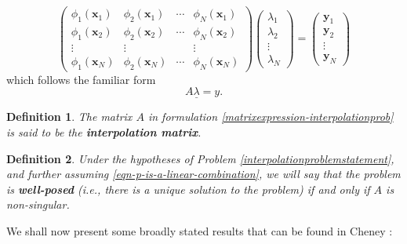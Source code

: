\documentclass[12pt]{report} %
\newtheorem{definition}{Definition}
\newcommand{\tmmathbf}[1]{\ensuremath{\boldsymbol{#1}}}
\newcommand{\tmstrong}[1]{\textbf{#1}}
\begin{document}
\begin{equation}
  \left(\begin{array}{cccc}
      \phi_1 (\tmmathbf{x}_1) & \phi_2 (\tmmathbf{x}_1) & \cdots & \phi_N
      (\tmmathbf{x}_1)                                                    \\
      \phi_1 (\tmmathbf{x}_2) & \phi_2 (\tmmathbf{x}_2) & \cdots & \phi_N
      (\tmmathbf{x}_2)                                                    \\
      \vdots                  & \vdots                  &        & \vdots \\
      \phi_1 (\tmmathbf{x}_N) & \phi_2 (\tmmathbf{x}_N) & \cdots & \phi_N
      (\tmmathbf{x}_N)
    \end{array}\right) \left(\begin{array}{c}
      \lambda_1 \\
      \lambda_2 \\
      \vdots    \\
      \lambda_N
    \end{array}\right) = \left(\begin{array}{c}
      \tmmathbf{y}_1 \\
      \tmmathbf{y}_2 \\
      \vdots         \\
      \tmmathbf{y}_N
    \end{array}\right) \label{linear-system-equations-generalized-poly}
\end{equation}
which follows the familiar form
\begin{equation}
  A \underline{\lambda} = y \label{matrixexpression-interpolationprob} .
\end{equation}
\begin{definition}
  The matrix $A$ in formulation \eqref{matrixexpression-interpolationprob} is said to
  be the {\tmstrong{interpolation matrix}}.
\end{definition}

\begin{definition}
  Under the hypotheses of Problem \ref{interpolationproblemstatement}, and
  further assuming \eqref{eqn-p-is-a-linear-combination}, we will say that the problem is
    {\tmstrong{well-posed}} (i.e., there is a unique solution to the problem) if
  and only if $A$ is non-singular.
\end{definition}


We shall now present some broadly stated results that can be found in Cheney \cite{cheney1966introduction}:
\end{document}
